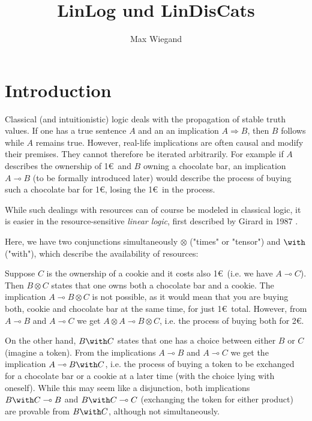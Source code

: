 \documentclass[DIN, pagenumber=false, fontsize=11pt, parskip=half, colorinlistoftodos, svgnames]{scrartcl}
\title{LinLog und LinDisCats}
\author{Max Wiegand}
\begin{document}
	\maketitle
	
	\section{Introduction}
	
	
	
	Classical (and intuitionistic) logic deals with the propagation of stable truth values. If one has a true sentence $A$ and an an implication $A \Rightarrow B$, then $B$ follows while $A$ remains true. However, real-life implications are often causal and modify their premises. They cannot therefore be iterated arbitrarily. For example if $A$ describes the ownership of 1\euro\ and $B$ owning a chocolate bar, an implication $A \multimap B$ (to be formally introduced later) would describe the process of buying such a chocolate bar for 1\euro, losing the 1\euro\ in the process.
	
	While such dealings with resources can of course be modeled in classical logic, it is easier in the resource-sensitive \emph{linear logic}, first described by Girard in 1987 \cite{girard87}. 
	
	Here, we have two conjunctions simultaneously $\otimes$ ("times" or "tensor") and $\with$ ("with"), which describe the availability of resources:
	
	Suppose $C$ is the ownership of a cookie and it costs also 1\euro\ (i.e. we have $A\multimap C$). Then $B \otimes C$ states that one owns both a chocolate bar and a cookie. The implication $A \multimap B \otimes C$ is not possible, as it would mean that you are buying both, cookie and chocolate bar at the same time, for just 1\euro\ total. However, from $A \multimap B$ and $A\multimap C$ we get $A \otimes A \multimap B \otimes C$, i.e. the process of buying both for 2\euro.
	
	On the other hand, $B \with C$ states that one has a choice between either $B$ or $C$ (imagine a token). From the implications $A\multimap B$ and $A\multimap C$ we get the implication $A \multimap B \with C$, i.e. the process of buying a token to be exchanged for a chocolate bar or a cookie at a later time (with the choice lying with oneself). While this may  seem like a disjunction, both implications $B\with C \multimap B$ and $B \with C \multimap C$ (exchanging the token for either product) are provable from $B \with C$, although not simultaneously. 
	
\end{document}
